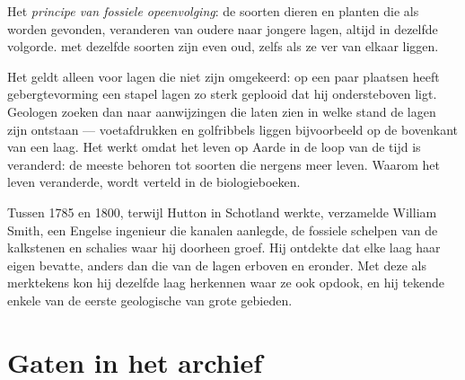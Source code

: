 \begin{definition}\label{def:g7:geological-time:fossil-succession}
Het \emph{principe van fossiele opeenvolging}:
de soorten dieren en planten die als  worden gevonden, veranderen
van oudere naar jongere lagen, altijd in dezelfde volgorde.  met
dezelfde soorten  zijn even oud, zelfs als ze ver van elkaar
liggen.
\end{definition}


Het  geldt alleen voor lagen die niet zijn
omgekeerd: op een paar plaatsen heeft gebergtevorming een stapel lagen zo
sterk geplooid dat hij ondersteboven ligt. Geologen zoeken dan naar
aanwijzingen die laten zien in welke stand de lagen zijn ontstaan ---
voetafdrukken en golfribbels liggen bijvoorbeeld op de bovenkant van een
laag. Het  werkt omdat het leven op Aarde
in de loop van de tijd is veranderd: de meeste  behoren tot
soorten die nergens meer leven. Waarom het leven veranderde, wordt verteld
in de biologieboeken.

\begin{history}
Tussen 1785 en 1800, terwijl Hutton in Schotland werkte, verzamelde William
Smith, een Engelse ingenieur die kanalen aanlegde, de fossiele schelpen van
de kalkstenen en schalies waar hij doorheen groef. Hij ontdekte dat elke
laag haar eigen  bevatte, anders dan die van de lagen erboven en
eronder. Met deze  als merktekens kon hij dezelfde laag herkennen
waar ze ook opdook, en hij tekende enkele van de eerste geologische 
van grote gebieden.
\end{history}

\section{Gaten in het archief}

